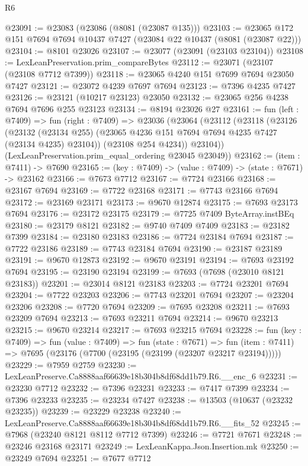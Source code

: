\begin{lexlean}{R6}
\begin{coremodule}
@23091 := @23083 (@23086 (@8081 (@23087 @135)))
@23103 := @23065 @172 @151 @7694 @7694 @10437 @7427 (@23084 @22 @10437 (@8081 (@23087 @22)))
@23104 := @8101 @23026
@23107 := @23077 (@23091 (@23103 @23104))
@23108 := LexLeanPreservation.prim_compareBytes
@23112 := @23071 (@23107 (@23108 @7712 @7399))
@23118 := @23065 @4240 @151 @7699 @7694 @23050 @7427
@23121 := @23072 @4239 @7697 @7694
@23123 := @7396 @4235 @7427
@23126 := @23121 (@10217 @23123) @23050
@23132 := @23065 @256 @4238 @7694 @7696 @255 @23123
@23134 := @8194 @23026 @27
@23161 := fun (left : @7409) =>
  fun (right : @7409) =>
  @23036
    (@23064
      (@23112
        (@23118
          (@23126
            (@23132 (@23134 @255) (@23065 @4236 @151 @7694 @7694 @4235 @7427 (@23134 @4235) @23104))
            (@23108 @254 @4234))
          @23104))
      (LexLeanPreservation.prim_equal_ordering @23045 @23049))
@23162 := (item : @7411) -> @7690
@23165 := (key : @7409) -> (value : @7409) -> (state : @7671) -> @23162
@23166 := @7673 @7712
@23167 := @7724 @23166
@23168 := @23167 @7694
@23169 := @7722 @23168
@23171 := @7743 @23166 @7694
@23172 := @23169 @23171
@23173 := @9670 @12874
@23175 := @7693 @23173 @7694
@23176 := @23172 @23175
@23179 := @7725 @7409 ByteArray.instBEq
@23180 := @23179 @8121
@23182 := @9740 @7409 @7409
@23183 := @23182 @7399
@23184 := @23180 @23183
@23186 := @7724 @23184 @7694
@23187 := @7722 @23186
@23189 := @7743 @23184 @7694
@23190 := @23187 @23189
@23191 := @9670 @12873
@23192 := @9670 @23191
@23194 := @7693 @23192 @7694
@23195 := @23190 @23194
@23199 := @7693 (@7698 (@23010 @8121 @23183))
@23201 := @23014 @8121 @23183
@23203 := @7724 @23201 @7694
@23204 := @7722 @23203
@23206 := @7743 @23201 @7694
@23207 := @23204 @23206
@23208 := @7720 @7694
@23209 := @7695 @23208
@23211 := @7693 @23209 @7694
@23213 := @7693 @23211 @7694
@23214 := @9670 @23213
@23215 := @9670 @23214
@23217 := @7693 @23215 @7694
@23228 := fun (key : @7409) =>
  fun (value : @7409) =>
  fun (state : @7671) =>
  fun (item : @7411) => @7695 (@23176 (@7700 (@23195 (@23199 (@23207 @23217 @23194)))))
@23229 := @7959 @2759
@23230 := LexLeanPreserve.Ca8888aaf66639e18b304b8df68dd1b79.R6.__enc_6
@23231 := @23230 @7712
@23232 := @7396 @23231
@23233 := @7417 @7399
@23234 := @7396 @23233
@23235 := @23234 @7427
@23238 := @13503 (@10637 (@23232 @23235))
@23239 := @23229 @23238
@23240 := LexLeanPreserve.Ca8888aaf66639e18b304b8df68dd1b79.R6.__fits_52
@23245 := @7968 (@23240 @8121 @8112 @7712 @7399)
@23246 := @7721 @7671
@23248 := @23246 @23168 @23171
@23249 := LexLeanKappa.Json.Insertion.mk
@23250 := @23249 @7694
@23251 := @7677 @7712

\end{coremodule}
\end{lexlean}
